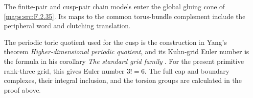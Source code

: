 \begin{remark}\label{rem:V:cusp-input-and-global-chains}
The finite-pair and cusp-pair chain models enter the global
gluing cone of \cref{maps:src:F.2.35}. Its maps to the common
torus-bundle complement include the peripheral word and clutching
translation.

The periodic toric quotient used for the cusp is the construction in
Yang's theorem \emph{Higher-dimensional periodic quotient}, and its
Kuhn-grid Euler number is the formula in his corollary
\emph{The standard grid family}
\cite[Theorem 8.7, pp.~57--59, and Corollary 8.8, p.~59, arXiv v1]{Yang2026}.
For the present primitive rank-three grid, this gives Euler number
$3!=6$.  The full cap and boundary complexes, their integral inclusion,
and the torsion groups are calculated in the proof above.
\end{remark}







